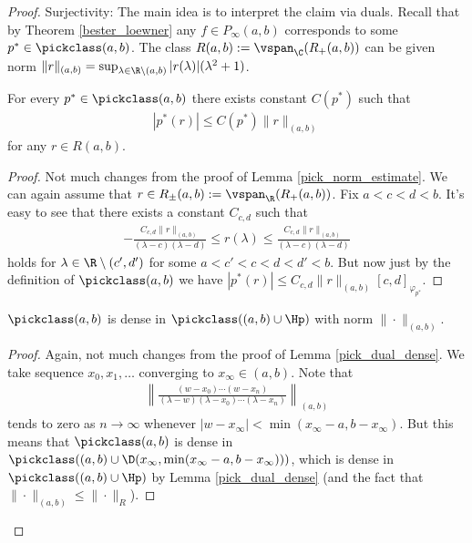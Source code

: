 \begin{proof}
	Surjectivity: The main idea is to interpret the claim via duals. Recall that by Theorem \ref{bester_loewner} any $f \in P_{\infty}(a, b)$ corresponds to some $p^{*} \in \pickclass(a, b)$. The class $R(a, b) := \vspan_{\C}(R_{+}(a, b))$ can be given norm $\|r\|_{(a, b)} = \sup_{\lambda \in \R \setminus (a, b)} |r(\lambda)| (\lambda^{2} + 1)$.
	\begin{lem}\label{pick_norm_estimate_2}
		For every $p^{*} \in \pickclass(a, b)$ there exists constant $C(p^{*})$ such that
		\begin{align*}
			\left|p^{*} (r)\right| \leq C(p^{*}) \|r\|_{(a, b)}
		\end{align*}
		for any $r \in R(a, b)$.
	\end{lem}
	\begin{proof}
		Not much changes from the proof of Lemma \ref{pick_norm_estimate}. We can again assume that $r \in R_{\pm}(a, b) := \vspan_{\R}(R_{+}(a, b))$. Fix $a < c < d < b$. It's easy to see that there exists a constant $C_{c, d}$ such that
		\begin{align*}
			-\frac{C_{c, d}\|r\|_{(a, b)}}{(\lambda - c) (\lambda - d)} \leq r(\lambda) \leq \frac{C_{c, d}\|r\|_{(a, b)}}{(\lambda - c) (\lambda - d)}
		\end{align*}
		holds for $\lambda \in \R \setminus (c', d')$ for some $a < c' < c < d < d' < b$. But now just by the definition of $\pickclass(a, b)$ we have $|p^{*}(r)| \leq C_{c, d}\|r\|_{(a, b)} [c, d]_{\varphi_{p^{*}}}$.
	\end{proof}
	\begin{lem}\label{pick_dual_dense_2}
		$\pickclass(a, b)$ is dense in $\pickclass((a, b) \cup \Hp)$ with norm $\|\cdot\|_{(a, b)}$.
	\end{lem}
	\begin{proof}
		Again, not much changes from the proof of Lemma \ref{pick_dual_dense}. We take sequence $x_{0}, x_{1}, \ldots $ converging to $x_{\infty} \in (a, b)$. Note that
		\begin{align*}
			\left\|\frac{(w - x_{0}) \cdots (w - x_{n})}{(\lambda - w)(\lambda - x_{0}) \cdots (\lambda - x_{n})}\right\|_{(a, b)}
		\end{align*}
		tends to zero as $n \to \infty$ whenever $|w - x_{\infty}| < \min(x_{\infty} - a, b - x_{\infty})$. But this means that $\pickclass(a, b)$ is dense in $\pickclass((a, b) \cup \D(x_{\infty}, \min(x_{\infty} - a, b - x_{\infty})))$, which is dense in $\pickclass((a, b) \cup \Hp)$ by Lemma \ref{pick_dual_dense} (and the fact that $\|\cdot\|_{(a, b)} \leq \|\cdot\|_{R}$).

\end{proof}
\end{proof}
